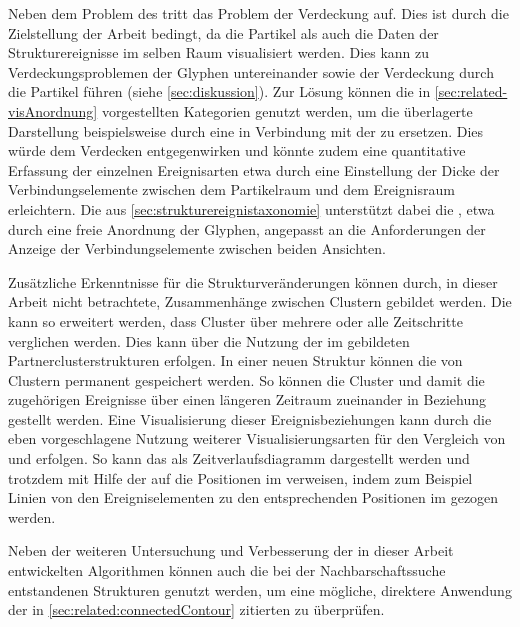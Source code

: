 Neben dem Problem des  tritt das Problem der Verdeckung auf. Dies ist durch die Zielstellung der Arbeit bedingt, da die Partikel als auch die Daten der Strukturereignisse im selben Raum visualisiert werden. Dies kann zu Verdeckungsproblemen der Glyphen untereinander sowie der Verdeckung durch die Partikel führen (siehe \autoref{sec:diskussion}). Zur Lösung können die in \autoref{sec:related-visAnordnung} vorgestellten Kategorien genutzt werden, um die überlagerte Darstellung beispielsweise durch eine  in Verbindung mit der  zu ersetzen. Dies würde dem Verdecken entgegenwirken und könnte zudem eine quantitative Erfassung der einzelnen Ereignisarten etwa durch eine Einstellung der Dicke der Verbindungselemente zwischen dem Partikelraum und dem Ereignisraum erleichtern. Die  aus \autoref{sec:strukturereignistaxonomie} unterstützt dabei die , etwa durch eine freie Anordnung der Glyphen, angepasst an die Anforderungen der Anzeige der Verbindungselemente zwischen beiden Ansichten.

Zusätzliche Erkenntnisse für die Strukturveränderungen können durch, in dieser Arbeit nicht betrachtete, Zusammenhänge zwischen Clustern gebildet werden. Die  kann so erweitert werden, dass Cluster über mehrere oder alle Zeitschritte verglichen werden. Dies kann über die Nutzung der im \SECC gebildeten Partnerclusterstrukturen erfolgen. In einer neuen Struktur können die  von Clustern permanent gespeichert werden. So können die Cluster und damit die zugehörigen Ereignisse über einen längeren Zeitraum zueinander in Beziehung gestellt werden. Eine Visualisierung dieser Ereignisbeziehungen kann durch die eben vorgeschlagene Nutzung weiterer Visualisierungsarten für den Vergleich von  und  erfolgen. So kann das  als Zeitverlaufsdiagramm dargestellt werden und trotzdem mit Hilfe der  auf die Positionen im  verweisen, indem zum Beispiel Linien von den Ereigniselementen zu den entsprechenden Positionen im  gezogen werden.
	
	
Neben der weiteren Untersuchung und Verbesserung der in dieser Arbeit entwickelten Algorithmen können auch die bei der Nachbarschaftssuche entstandenen Strukturen genutzt werden, um eine mögliche, direktere Anwendung der in \autoref{sec:related:connectedContour} zitierten  zu überprüfen.

